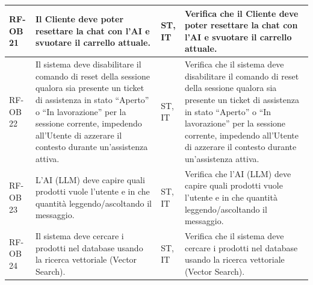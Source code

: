\documentclass[a4paper,11pt,oneside]{scrartcl}
\begin{document}
\begin{longtable}{|p{1.5cm}|p{4.5cm}|p{1.8cm}|p{6cm}|}
    RF-OB 21         & Il Cliente deve poter resettare la chat con l'AI e svuotare il carrello attuale.                                                                                                                                                                                                                      & ST, IT             & Verifica che il Cliente deve poter resettare la chat con l'AI e svuotare il carrello attuale.                                                                                                                                                                                                                      \\ \hline
    RF-OB 22         & Il sistema deve disabilitare il comando di reset della sessione qualora sia presente un ticket di assistenza in stato ``Aperto'' o ``In lavorazione'' per la sessione corrente, impedendo all'Utente di azzerare il contesto durante un'assistenza attiva.                                            & ST, IT             & Verifica che il sistema deve disabilitare il comando di reset della sessione qualora sia presente un ticket di assistenza in stato ``Aperto'' o ``In lavorazione'' per la sessione corrente, impedendo all'Utente di azzerare il contesto durante un'assistenza attiva.                                            \\ \hline
    RF-OB 23         & L'AI (LLM) deve capire quali prodotti vuole l'utente e in che quantità leggendo/ascoltando il messaggio.                                                                                                                                                                                              & ST, IT             & Verifica che l'AI (LLM) deve capire quali prodotti vuole l'utente e in che quantità leggendo/ascoltando il messaggio.                                                                                                                                                                                              \\ \hline
    RF-OB 24         & Il sistema deve cercare i prodotti nel database usando la ricerca vettoriale (Vector Search).                                                                                                                                                                                                         & ST, IT             & Verifica che il sistema deve cercare i prodotti nel database usando la ricerca vettoriale (Vector Search).                                                                                                                                                                                                         \\ \hline

\end{longtable}
\end{document}
